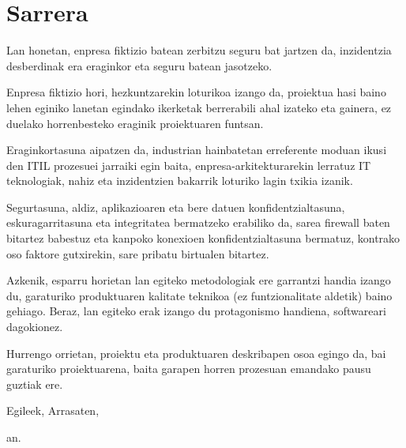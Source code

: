 \section*{Sarrera}

Lan honetan, enpresa fiktizio batean zerbitzu seguru bat jartzen da, inzidentzia desberdinak era eraginkor eta seguru batean jasotzeko.

Enpresa fiktizio hori, hezkuntzarekin loturikoa izango da, proiektua hasi baino lehen eginiko lanetan egindako ikerketak berrerabili ahal izateko eta gainera, ez duelako horrenbesteko eraginik proiektuaren funtsan.

Eraginkortasuna aipatzen da, industrian hainbatetan erreferente moduan ikusi den ITIL prozesuei jarraiki egin baita, enpresa-arkitekturarekin lerratuz IT teknologiak, nahiz eta inzidentzien bakarrik loturiko lagin txikia izanik. 

Segurtasuna, aldiz, aplikazioaren eta bere datuen konfidentzialtasuna, eskuragarritasuna eta integritatea bermatzeko erabiliko da, sarea firewall baten bitartez babestuz eta kanpoko konexioen konfidentzialtasuna bermatuz, kontrako oso faktore gutxirekin, sare pribatu birtualen bitartez.

Azkenik, esparru horietan lan egiteko metodologiak ere garrantzi handia izango du, garaturiko produktuaren kalitate teknikoa (ez funtzionalitate aldetik) baino gehiago. Beraz, lan egiteko erak izango du protagonismo handiena, softwareari dagokionez.

Hurrengo orrietan, proiektu eta produktuaren deskribapen osoa egingo da, bai garaturiko proiektuarena, baita garapen horren prozesuan emandako pausu guztiak ere. 

\begin{flushright}
Egileek, Arrasaten, \date{\today}an.
\end{flushright}
